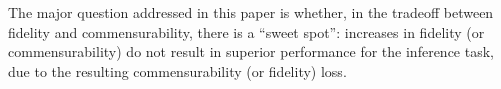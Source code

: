 \documentclass[12pt]{article} %
\begin{document}
The major question  addressed in this paper is whether, in the tradeoff between fidelity and commensurability, there is a ``sweet spot'': increases in fidelity (or commensurability) do not result in superior performance for  the inference task, due to the resulting commensurability (or fidelity) loss. 

    

\end{document}
